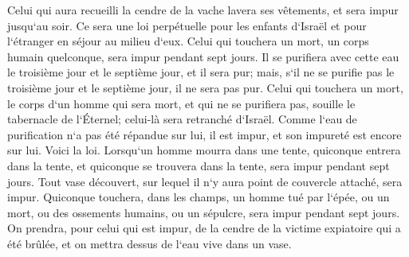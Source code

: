 \verse Celui qui aura recueilli la cendre de la vache lavera ses vêtements, et sera impur jusqu`au soir. Ce sera une loi perpétuelle pour les enfants d`Israël et pour l`étranger en séjour au milieu d`eux. 
\verse Celui qui touchera un mort, un corps humain quelconque, sera impur pendant sept jours. 
\verse Il se purifiera avec cette eau le troisième jour et le septième jour, et il sera pur; mais, s`il ne se purifie pas le troisième jour et le septième jour, il ne sera pas pur. 
\verse Celui qui touchera un mort, le corps d`un homme qui sera mort, et qui ne se purifiera pas, souille le tabernacle de l`Éternel; celui-là sera retranché d`Israël. Comme l`eau de purification n`a pas été répandue sur lui, il est impur, et son impureté est encore sur lui. 
\verse Voici la loi. Lorsqu`un homme mourra dans une tente, quiconque entrera dans la tente, et quiconque se trouvera dans la tente, sera impur pendant sept jours. 
\verse Tout vase découvert, sur lequel il n`y aura point de couvercle attaché, sera impur. 
\verse Quiconque touchera, dans les champs, un homme tué par l`épée, ou un mort, ou des ossements humains, ou un sépulcre, sera impur pendant sept jours. 
\verse On prendra, pour celui qui est impur, de la cendre de la victime expiatoire qui a été brûlée, et on mettra dessus de l`eau vive dans un vase. 
